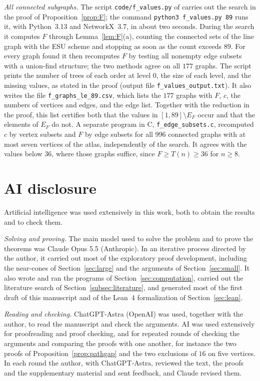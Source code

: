 \documentclass[11pt]{amsart}
\theoremstyle{definition}
\theoremstyle{remark}
\newcommand{\Tr}[1]{T(#1)}
\begin{document}
\emph{All connected subgraphs.} The script \texttt{code/f\_values.py} of \cite{GRep} carries out the search in the proof of Proposition~\ref{prop:F}; the command \texttt{python3 f\_values.py 89} runs it, with Python~3.13 and NetworkX~3.7, in about two seconds. During the search it computes $F$ through Lemma~\ref{lem:F}(a), counting the connected sets of the line graph with the ESU scheme and stopping as soon as the count exceeds $89$. For every graph found it then recomputes $F$ by testing all nonempty edge subsets with a union-find structure; the two methods agree on all $177$ graphs. The script prints the number of trees of each order at level $0$, the size of each level, and the missing values, as stated in the proof (output file \texttt{f\_values\_output.txt}). It also writes the file \texttt{f\_graphs\_le\_89.csv}, which lists the $177$ graphs with $F$, $c$, the numbers of vertices and edges, and the edge list. Together with the reduction in the proof, this list certifies both that the values in $[1,89]\setminus E_F$ occur and that the elements of $E_F$ do not. A separate program in C, \texttt{f\_edge\_subsets.c}, recomputed $c$ by vertex subsets and $F$ by edge subsets for all $996$ connected graphs with at most seven vertices of the atlas, independently of the search. It agrees with the values below $36$, where those graphs suffice, since $F\ge\Tr{n}\ge36$ for $n\ge8$.

\section*{AI disclosure}

Artificial intelligence was used extensively in this work, both to obtain the results and to check them.

\emph{Solving and proving.} The main model used to solve the problem and to prove the theorems was Claude Opus 5.5 (Anthropic). In an iterative process directed by the author, it carried out most of the exploratory proof development, including the near-cones of Section~\ref{sec:large} and the arguments of Section~\ref{sec:small}. It also wrote and ran the programs of Section~\ref{sec:computation}, carried out the literature search of Section~\ref{subsec:literature}, and generated most of the first draft of this manuscript and of the Lean~4 formalization of Section~\ref{sec:lean}.

\emph{Reading and checking.} ChatGPT-Astra (OpenAI) was used, together with the author, to read the manuscript and check the arguments. AI was used extensively for proofreading and proof checking, and for repeated rounds of checking the arguments and comparing the proofs with one another, for instance the two proofs of Proposition~\ref{prop:pathgap} and the two exclusions of $16$ on five vertices. In each round the author, with ChatGPT-Astra, reviewed the text, the proofs and the supplementary material and sent feedback, and Claude revised them.
\end{document}
